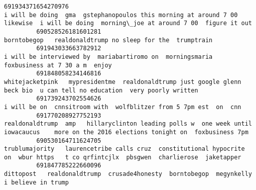 \documentclass[11pt]{article}
\begin{document}
\begin{Verbatim}[commandchars=\\\{\}]
         691934371654270976                                                                                                                                                  i will be doing  gma  gstephanopoulos this morning at around 7 00  likewise  i will be doing  morning\_joe at around 7 00  figure it out    
         690528526181601281                                                                                                                                                                                                                              borntobegop   realdonaldtrump no sleep for the  trumptrain     
         691943033663782912                                                                                                                                                                                              i will be interviewed by  mariabartiromo on  morningsmaria   foxbusiness at 7 30 a m  enjoy    
         691848058234146816                                                                                                                                                                whitejacketpink   mypresidentme  realdonaldtrump just google glenn beck bio  u can tell no education  very poorly written    
         691739243702554626                                                                                                                                                                                                                       i will be on  cnnsitroom with  wolfblitzer from 5 7pm est  on  cnn    
         691770208927752193                                                                                                                                              realdonaldtrump  amp   hillaryclinton leading polls w  one week until  iowacaucus    more on the 2016 elections tonight on  foxbusiness 7pm    
         690530164711624705                                                                                                                                                   trublumajority   laurencetribe calls cruz  constitutional hypocrite  on  wbur https   t co qrfintcjlx  pbsgwen  charlierose  jaketapper   
         691847785222660096                                                                                                                                                                                              dittopost   realdonaldtrump  crusade4honesty  borntobegop  megynkelly i believe in trump       
         

\end{Verbatim}
\end{document}
